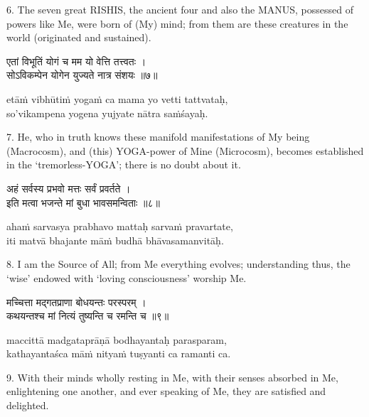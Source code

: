 6. The seven great RISHIS, the ancient four and also the MANUS, possessed of
powers like Me, were born of (My) mind; from them are these creatures in the
world (originated and sustained).

\begin{gitaverse}
एतां विभूतिं योगं च मम यो वेत्ति तत्त्वतः । \\
सोऽविकम्पेन योगेन युज्यते नात्र संशयः ॥७॥
\end{gitaverse}

\begin{transliteration}
etāṁ vibhūtiṁ yogaṁ ca mama yo vetti tattvataḥ, \\
so'vikampena yogena yujyate nātra saṁśayaḥ.
\end{transliteration}

7. He, who in truth knows these manifold manifestations of My being
(Macrocosm), and (this) YOGA-power of Mine (Microcosm), becomes established in
the `tremorless-YOGA'; there is no doubt about it.

\begin{gitaverse}
अहं सर्वस्य प्रभवो मत्तः सर्वं प्रवर्तते । \\
इति मत्वा भजन्ते मां बुधा भावसमन्विताः ॥८॥
\end{gitaverse}

\begin{transliteration}
ahaṁ sarvasya prabhavo mattaḥ sarvaṁ pravartate, \\
iti matvā bhajante māṁ budhā bhāvasamanvitāḥ.
\end{transliteration}

8. I am the Source of All; from Me everything evolves; understanding thus, the
`wise' endowed with `loving consciousness' worship Me.

\begin{gitaverse}
मच्चित्ता मद्गतप्राणा बोधयन्तः परस्परम् । \\
कथयन्तश्च मां नित्यं तुष्यन्ति च रमन्ति च ॥९॥
\end{gitaverse}

\begin{transliteration}
maccittā madgataprāṇā bodhayantaḥ parasparam, \\
kathayantaśca māṁ nityaṁ tuṣyanti ca ramanti ca.
\end{transliteration}

9. With their minds wholly resting in Me, with their senses absorbed in Me,
enlightening one another, and ever speaking of Me, they are satisfied and
delighted.

